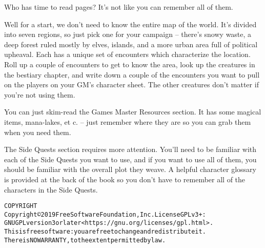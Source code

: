 \begin{multicols}{2}

\noindent Who has time to read \pageref{lastpage} pages?  It's not like you can remember all of them.

Well for a start, we don't need to know the entire map of the world.
It's divided into seven regions, so just pick one for your campaign -- there's snowy waste, a deep forest ruled mostly by elves, islands, and a more urban area full of political upheaval.
Each has a unique set of encounters which characterize the location.
Roll up a couple of encounters to get to know the area, look up the creatures in the bestiary chapter, and write down a couple of the encounters you want to pull on the players on your GM's character sheet.
The other creatures don't matter if you're not using them.

You can just skim-read the Games Master Resources section.
It has some magical items, mana-lakes, et c. -- just remember where they are so you can grab them when you need them.

The Side Quests section requires more attention.
You'll need to be familiar with each of the Side Quests you want to use, and if you want to use all of them, you should be familiar with the overall plot they weave.
A helpful character glossary is provided at the back of the book so you don't have to remember all of the characters in the Side Quests.

\end{multicols}

\begin{alltt}
COPYRIGHT
       Copyright \copyright 2019 Free Software Foundation, Inc.  License GPLv3+:
	GNU GPL version 3 or later <https://gnu.org/licenses/gpl.html>.
       This is free software: you are free to change and redistribute it.
	There is NO WARRANTY, to the extent permitted by law.

\end{alltt}
